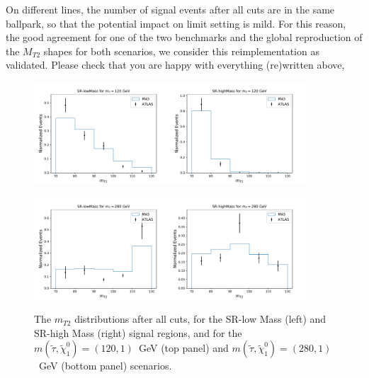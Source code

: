 \documentclass{ws-mpla}
\begin{document}
On different lines, the number of signal events after all cuts are in the same ballpark, so that the potential impact on limit setting is mild. For this reason, the good agreement for one of the two benchmarks and the global reproduction of the $M_{T2}$ shapes for both scenarios, we consider this reimplementation as validated.
{\color{red}Please check that you are happy with everything (re)written above,}

\begin{figure}[t]
  \centerline{\includegraphics[width=2.0in]{m120_SRlow}\includegraphics[width=2.0in]{m120_SRhigh}}
  \vspace*{8pt}
  \centerline{\includegraphics[width=2.0in]{m280_SRlow}\includegraphics[width=2.0in]{m280_SRhigh}}
  \caption{The $m_{T2}$ distributions after all cuts, for the SR-low Mass (left) and SR-high Mass (right) signal regions, and for the $m(\tilde{\tau},\tilde{\chi}^0_1)=(120,1)$~GeV (top panel) and $m(\tilde{\tau},\tilde{\chi}^0_1)=(280,1)$~GeV (bottom panel) scenarios.\protect\label{fig:mt2}}
\end{figure}
\end{document}
